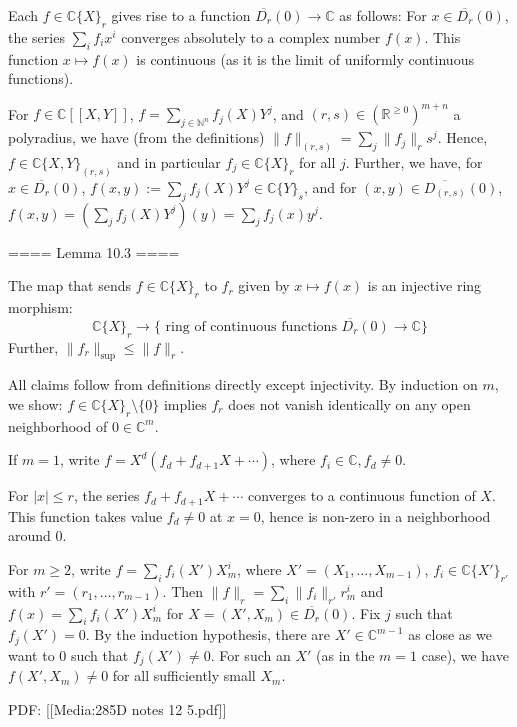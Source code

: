 Each $f\in\mathbb{C}\{X\}_r$ gives rise to a function $\overline{D_r}(0)\rightarrow\mathbb{C}$ as follows:
For $x\in\overline{D_r}(0)$, the series $\sum_i f_i x^i$ converges absolutely to a complex number $f(x)$.
This function $x\mapsto f(x)$ is continuous (as it is the limit of uniformly continuous functions).

For $f\in \mathbb{C}[[X,Y]]$, $f = \sum_{j\in \mathbb{N}^n} f_j(X) Y^j$, 
and $(r,s)\in (\mathbb{R}^{\geq 0})^{m+n}$ a polyradius, we have (from the definitions)
$\|f\|_{(r,s)} = \sum_j \|f_j\|_r s^j$.
Hence, $f\in \mathbb{C}\{X,Y\}_{(r,s)}$ and in particular $f_j\in \mathbb{C}\{X\}_r$ for all $j$.
Further, we have,
for $x\in \overline{D_r}(0)$, $f(x,y):= \sum_j f_j(X)Y^j\in \mathbb{C}\{Y\}_s$,
and for $(x,y)\in \overline{D_{(r,s)}}(0)$, $f(x,y) = \left( \sum_j f_j(X)Y^j\right)(y) = \sum_j f_j(x)y^j$.

==== Lemma 10.3 ====

The map that sends $f\in \mathbb{C}\{X\}_r$ to $f_r$ given by $x\mapsto f(x)$ is an injective ring morphism:
$$\mathbb{C}\{X\}_r \rightarrow \{\textrm{ ring of continuous functions } \overline{D_r}(0) \rightarrow \mathbb{C}\}$$
Further, $\|f_r\|_{\mathrm{sup}} \leq \|f\|_r$.


All claims follow from definitions directly except injectivity. By induction on $m$, we show:
$f\in \mathbb{C}\{X\}_r\setminus \{0\}$ implies $f_r$ does not vanish identically on any open neighborhood of $0\in \mathbb{C}^m$.

If $m=1$, write $f = X^d (f_d + f_{d+1} X + \cdots )$, where $f_i\in \mathbb{C}, f_d\neq 0$.

For $|x|\leq r$, the series $f_d + f_{d+1}X + \cdots $ converges to a continuous function of $X$.
This function takes value $f_d\neq 0$ at $x=0$, hence is non-zero in a neighborhood around $0$.

For $m\geq 2$, write $f = \sum_i f_i(X') X_m^i$, where $X' = (X_1,\ldots, X_{m-1})$, $f_i \in \mathbb{C}\{X'\}_{r'}$
with $r' = (r_1,\ldots, r_{m-1})$.
Then $\|f\|_r = \sum_i \|f_i\|_{r'} r_m^i$ and $f(x) = \sum_i f_i(X')X_m^i$ for $X = (X',X_m)\in \overline{D_r}(0)$.
Fix $j$ such that $f_j(X') = 0$. By the induction hypothesis, there are $X'\in \mathbb{C}^{m-1}$ as close as we want to $0$
such that $f_j(X')\neq 0$. For such an $X'$ (as in the $m=1$ case), we have $f(X',X_m)\neq 0$ for all sufficiently small $X_m$.




PDF: [[Media:285D notes 12 5.pdf]]
